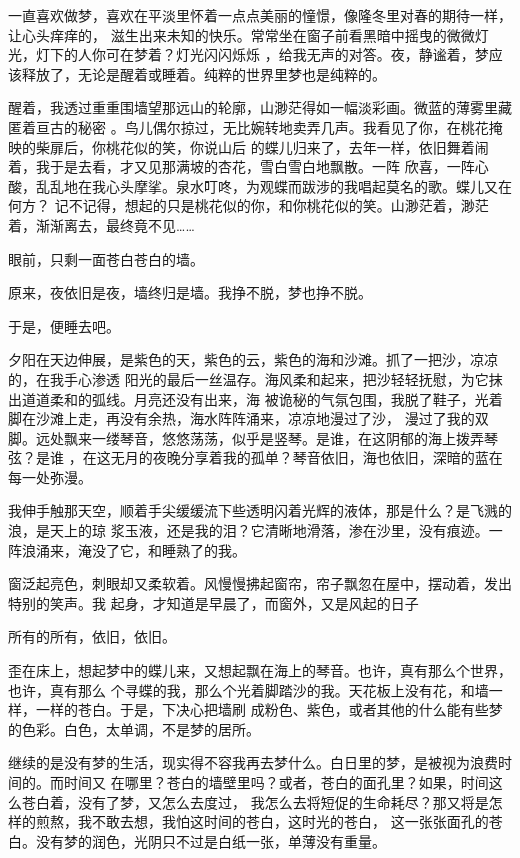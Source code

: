 \documentclass[12pt,a4paper]{article}
\begin{document}
		一直喜欢做梦，喜欢在平淡里怀着一点点美丽的憧憬，像隆冬里对春的期待一样，让心头痒痒的，
	滋生出来未知的快乐。常常坐在窗子前看黑暗中摇曳的微微灯光，灯下的人你可在梦着？灯光闪闪烁烁
	，给我无声的对答。夜，静谧着，梦应该释放了，无论是醒着或睡着。纯粹的世界里梦也是纯粹的。

		醒着，我透过重重围墙望那远山的轮廓，山渺茫得如一幅淡彩画。微蓝的薄雾里藏匿着亘古的秘密
	。鸟儿偶尔掠过，无比婉转地卖弄几声。我看见了你，在桃花掩映的柴扉后，你桃花似的笑，你说山后
	的蝶儿归来了，去年一样，依旧舞着闹着，我于是去看，才又见那满坡的杏花，雪白雪白地飘散。一阵
	欣喜，一阵心酸，乱乱地在我心头摩挲。泉水叮咚，为观蝶而跋涉的我唱起莫名的歌。蝶儿又在何方？
	记不记得，想起的只是桃花似的你，和你桃花似的笑。山渺茫着，渺茫着，渐渐离去，最终竟不见……

		眼前，只剩一面苍白苍白的墙。

		原来，夜依旧是夜，墙终归是墙。我挣不脱，梦也挣不脱。

		于是，便睡去吧。

		夕阳在天边伸展，是紫色的天，紫色的云，紫色的海和沙滩。抓了一把沙，凉凉的，在我手心渗透
	阳光的最后一丝温存。海风柔和起来，把沙轻轻抚慰，为它抹出道道柔和的弧线。月亮还没有出来，海
	被诡秘的气氛包围，我脱了鞋子，光着脚在沙滩上走，再没有余热，海水阵阵涌来，凉凉地漫过了沙，
	漫过了我的双脚。远处飘来一缕琴音，悠悠荡荡，似乎是竖琴。是谁，在这阴郁的海上拨弄琴弦？是谁
	，在这无月的夜晚分享着我的孤单？琴音依旧，海也依旧，深暗的蓝在每一处弥漫。

		我伸手触那天空，顺着手尖缓缓流下些透明闪着光辉的液体，那是什么？是飞溅的浪，是天上的琼
	浆玉液，还是我的泪？它清晰地滑落，渗在沙里，没有痕迹。一阵浪涌来，淹没了它，和睡熟了的我。

		窗泛起亮色，刺眼却又柔软着。风慢慢拂起窗帘，帘子飘忽在屋中，摆动着，发出特别的笑声。我
	起身，才知道是早晨了，而窗外，又是风起的日子

		所有的所有，依旧，依旧。

		歪在床上，想起梦中的蝶儿来，又想起飘在海上的琴音。也许，真有那么个世界，也许，真有那么
	个寻蝶的我，那么个光着脚踏沙的我。天花板上没有花，和墙一样，一样的苍白。于是，下决心把墙刷
	成粉色、紫色，或者其他的什么能有些梦的色彩。白色，太单调，不是梦的居所。

		继续的是没有梦的生活，现实得不容我再去梦什么。白日里的梦，是被视为浪费时间的。而时间又
	在哪里？苍白的墙壁里吗？或者，苍白的面孔里？如果，时间这么苍白着，没有了梦，又怎么去度过，
	我怎么去将短促的生命耗尽？那又将是怎样的煎熬，我不敢去想，我怕这时间的苍白，这时光的苍白，
	这一张张面孔的苍白。没有梦的润色，光阴只不过是白纸一张，单薄没有重量。
\end{document}
